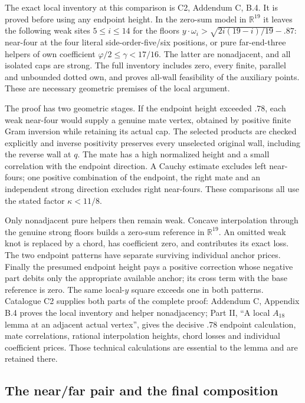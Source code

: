 \documentclass[11pt]{article}
\theoremstyle{remark}\newtheorem{remark}[theorem]{Remark}
\numberwithin{equation}{section}
\newcommand{\R}{\mathbb R}
\begin{document}
The exact local inventory at this comparison is C2, Addendum C, B.4.
It is proved before using any endpoint height. In the zero-sum model in
$\R^{19}$ it leaves the following weak sites $5\le i\le14$ for the
floors $y\cdot\omega_i>\sqrt{2i(19-i)/19}-.87$:
near-four at the four literal side-order-five/six positions, or pure
far-end-three helpers of own coefficient $\varphi/2\le\gamma<17/16$.
The latter are nonadjacent, and all isolated caps are strong. The full
inventory includes zero, every finite, parallel and unbounded dotted own,
and proves all-wall feasibility of the auxiliary points. These are
necessary geometric premises of the local argument.

The proof has two geometric stages. If the endpoint height exceeded
$.78$, each weak near-four would supply a genuine mate vertex, obtained
by positive finite Gram inversion while retaining its actual cap.
The selected products are checked explicitly and inverse positivity
preserves every unselected original wall, including the reverse wall at
$q$. The mate has a high normalized height and a small correlation with
the endpoint direction. A Cauchy estimate excludes left near-fours; one
positive combination of the endpoint, the right mate and an independent
strong direction excludes right near-fours. These comparisons all use
the stated factor $\kappa<11/8$.

Only nonadjacent pure helpers then remain weak. Concave interpolation
through the genuine strong floors builds a zero-sum reference in
$\R^{19}$. An omitted weak knot is replaced by a chord, has coefficient
zero, and contributes its exact loss. The two endpoint patterns have
separate surviving individual anchor prices. Finally the presumed
endpoint height pays a positive correction whose negative part debits
only the appropriate available anchor; its cross term with the base
reference is zero. The same local-$y$ square exceeds one in both
patterns. Catalogue C2 supplies both parts of the complete proof: Addendum C,
Appendix B.4 proves the local inventory and helper nonadjacency; Part II,
``A local $A_{18}$ lemma at an adjacent actual vertex'', gives the decisive
$.78$ endpoint calculation, mate correlations, rational interpolation
heights, chord losses and individual coefficient prices. Those technical
calculations are essential to the lemma and are retained there.

\subsection{The near/far pair and the final composition}
\label{compact:sec:composition}
\end{document}
